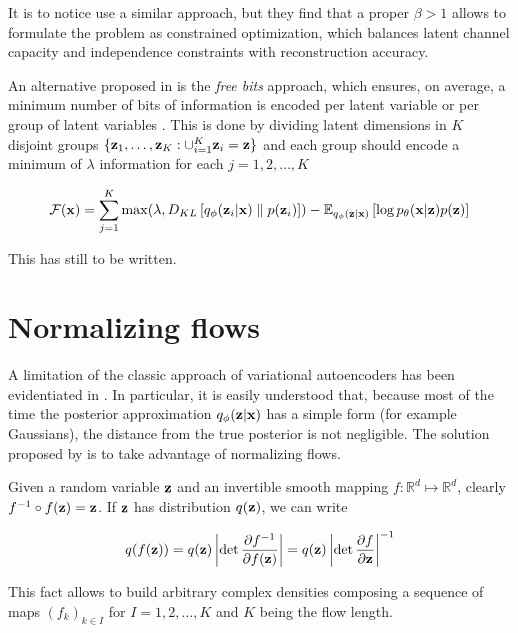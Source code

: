 \documentclass[12pt]{article}
\begin{document}
It is to notice \cite{Higgins2016betaVAELB} use a similar approach, but they find that a proper \(\beta > 1\) allows to formulate the problem as constrained optimization, which balances latent channel capacity and independence constraints with reconstruction accuracy. 


An alternative proposed in \cite{Kingma2016ImprovedVI} is the \textit{free bits} approach, which ensures, on average, a minimum number of bits of information is encoded per latent variable or per group of latent variables \cite{VAEIntro}. This is done by dividing latent dimensions in \(K\) disjoint groups \(\{\textbf{z}_1,\ldots,\textbf{z}_K: \cup_{i=1}^K\textbf{z}_i = \textbf{z}\}\) and each group should encode a minimum of \(\lambda\) information for each \(j=1,2,\ldots, K\)

\begin{equation}
    \mathcal{F}(\textbf{x}) = \sum_{j=1}^K \max(\lambda, D_{KL}\left[ q_{\phi}(\textbf{z}_i|\textbf{x}) \parallel p(\textbf{z}_i) \right]) - \mathbb{E}_{q_{\phi}(\textbf{z}|\textbf{x})} \left[ \log p_{\theta}(\textbf{x}|\textbf{z})p(\textbf{z}) \right]
\end{equation}


This has still to be written.

\section{Normalizing flows}
A limitation of the classic approach of variational autoencoders has been evidentiated in \cite{Mohamed2015VariationalIM}. In particular, it is easily understood that, because most of the time the posterior approximation \(q_\phi(\textbf{z}|\textbf{x})\) has a simple form (for example Gaussians), the distance from the true posterior is not negligible. The solution proposed by \cite{Mohamed2015VariationalIM} is to take advantage of normalizing flows.


Given a random variable \(\textbf{z}\) and an invertible smooth mapping \(f:\mathbb{R}^d \mapsto \mathbb{R}^d\), clearly \(f^{-1} \circ f(\textbf{z}) = \textbf{z}\). If \(\textbf{z}\) has distribution \(q(\textbf{z})\), we can write

\begin{align}
    q(f(\textbf{z})) = q(\textbf{z}) \left| \det \frac{\partial f^{-1}}{\partial f(\textbf{z})} \right| = q(\textbf{z}) \left| \det \frac{\partial f}{\partial \textbf{z}}\right|^{-1}
\end{align}

This fact allows to build arbitrary complex densities composing a sequence of maps \((f_k)_{k \in I}\) for \(I=1,2,\ldots,K\) and \(K\) being the flow length. 
\end{document}
